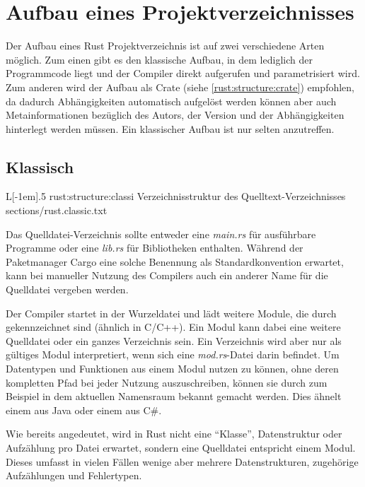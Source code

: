 \section{Aufbau eines Projektverzeichnisses}

Der Aufbau eines Rust Projektverzeichnis ist auf zwei verschiedene Arten möglich.
Zum einen gibt es den klassische Aufbau, in dem lediglich der Programmcode liegt und der Compiler direkt aufgerufen und parametrisiert wird.
Zum anderen wird der Aufbau als Crate (siehe \autoref{rust:structure:crate}) empfohlen, da dadurch Abhängigkeiten automatisch aufgelöst werden können aber auch Metainformationen bezüglich des Autors, der Version und der Abhängigkeiten hinterlegt werden müssen.
Ein klassischer Aufbau ist nur selten anzutreffen.


\subsection{Klassisch}
\label{rust:structure:classic}
\begin{wrapfigure}{L}[-1em]{.5\textwidth}
	\rustcinclude
		{rust:structure:classi}
		{Verzeichnisstruktur des Quelltext-Verzeichnisses}
		{sections/rust.classic.txt}
\end{wrapfigure}

Das Quelldatei-Verzeichnis sollte entweder eine \textit{main.rs} für ausführbare Programme oder eine \textit{lib.rs} für Bibliotheken enthalten.
Während der Paketmanager Cargo eine solche Benennung als Standardkonvention erwartet, kann bei manueller Nutzung des Compilers auch ein anderer Name für die Quelldatei vergeben werden.

Der Compiler startet in der Wurzeldatei und lädt weitere Module, die durch  gekennzeichnet sind (ähnlich  in C/C++).
Ein Modul kann dabei eine weitere Quelldatei oder ein ganzes Verzeichnis sein.
Ein Verzeichnis wird aber nur als gültiges Modul interpretiert, wenn sich eine \textit{mod.rs}-Datei darin befindet.
Um Datentypen und Funktionen aus einem Modul nutzen zu können, ohne deren kompletten Pfad bei jeder Nutzung auszuschreiben, können sie durch zum Beispiel  in dem aktuellen Namensraum bekannt gemacht werden.
Dies ähnelt einem  aus Java oder einem  aus C\#.

Wie bereits angedeutet, wird in Rust nicht eine \enquote{Klasse}, Datenstruktur oder Aufzählung pro Datei erwartet, sondern eine Quelldatei entspricht einem Modul.
Dieses umfasst in vielen Fällen wenige aber mehrere Datenstrukturen, zugehörige Aufzählungen und Fehlertypen.

